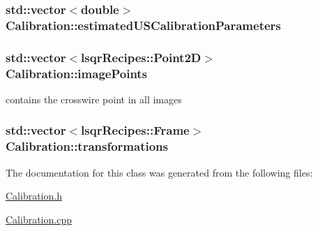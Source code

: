\hypertarget{class_calibration_ac6eb35a52a7c44b079af5e533be6b48b}{
\subsubsection[{estimated\-U\-S\-Calibration\-Parameters}]{\setlength{\rightskip}{0pt plus 5cm}std\-::vector$<$double$>$ {\bf Calibration\-::estimated\-U\-S\-Calibration\-Parameters}}}\label{d2/d40/class_calibration_ac6eb35a52a7c44b079af5e533be6b48b}
\hypertarget{class_calibration_a47ea86d69e758e27787531ff5cca8cc0}{
\subsubsection[{image\-Points}]{\setlength{\rightskip}{0pt plus 5cm}std\-::vector$<$lsqr\-Recipes\-::\-Point2\-D$>$ {\bf Calibration\-::image\-Points}}}\label{d2/d40/class_calibration_a47ea86d69e758e27787531ff5cca8cc0}


contains the crosswire point in all images 

\hypertarget{class_calibration_a017d6eeb363f25b9405c34dc9f8f3964}{
\subsubsection[{transformations}]{\setlength{\rightskip}{0pt plus 5cm}std\-::vector$<$lsqr\-Recipes\-::\-Frame$>$ {\bf Calibration\-::transformations}}}\label{d2/d40/class_calibration_a017d6eeb363f25b9405c34dc9f8f3964}


The documentation for this class was generated from the following files\-:\begin{DoxyCompactItemize}
\item 
\hyperlink{_calibration_8h}{Calibration.\-h}\item 
\hyperlink{_calibration_8cpp}{Calibration.\-cpp}\end{DoxyCompactItemize}
